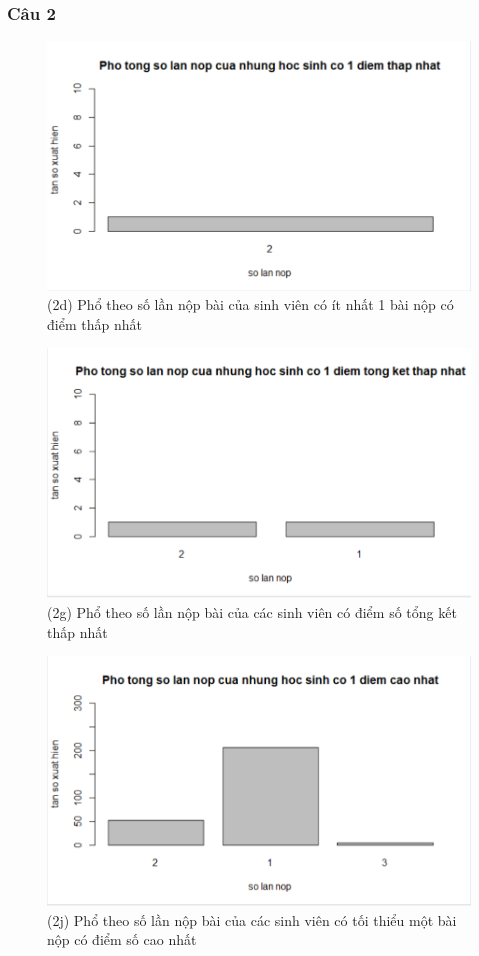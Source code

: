 \documentclass[a4paper]{article}
\theoremstyle{definition}
\begin{document}
\subsubsection{Câu 2}
\begin{figure}[!ht]
    \centering
    \includegraphics[scale=0.4]{Pics/q2d-file2.PNG}
    \caption{(2d) Phổ theo số lần nộp bài của sinh viên có ít nhất 1 bài nộp có điểm thấp nhất}
    \label{fig:my_label}
\end{figure}
\begin{figure}[!ht]
    \centering
    \includegraphics[scale=0.4]{Pics/q2g-file2.PNG}
    \caption{(2g) Phổ theo số lần nộp bài của các sinh viên có điểm số tổng kết thấp nhất }
    \label{fig:my_label}
\end{figure}
\newpage
\begin{figure}[!ht]
    \centering
    \includegraphics[scale=0.4]{Pics/q2j-file2.PNG}
    \caption{(2j)  Phổ theo số lần nộp bài của các sinh viên có tối thiểu một bài nộp có điểm số cao nhất}
    \label{fig:my_label}
\end{figure}
\end{document}
